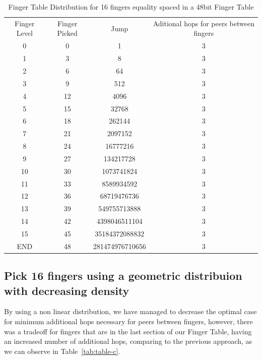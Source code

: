 \begin{table}
    \centering
    \begin{tabular}{| c | c | c | c |}
    \hline
        Finger Level &  Finger Picked & Jump & Aditional hops for peers between fingers \\
        0 & 0 & 1 & 3 \\
        1 & 3 & 8 & 3 \\
        2 & 6 & 64 & 3 \\
        3 & 9 & 512 & 3 \\
        4 & 12 & 4096 & 3 \\
        5 & 15 & 32768 & 3 \\
        6 & 18 & 262144 & 3 \\
        7 & 21 & 2097152 & 3 \\
        8 & 24 & 16777216 & 3 \\
        9 & 27 & 134217728 & 3 \\
        10 & 30 & 1073741824 & 3 \\
        11 & 33 & 8589934592 & 3 \\
        12 & 36 & 68719476736 & 3 \\
        13 & 39 & 549755713888 & 3 \\
        14 & 42 & 4398046511104 & 3 \\
        15 & 45 & 35184372088832 & 3 \\
        END & 48 & 281474976710656 & 3 \\
    \hline
    \end{tabular}
    \caption{Finger Table Distribution for 16 fingers equality spaced in a 48bit Finger Table}
    \label{tbl:table-b}
\end{table}

\subsection{Pick 16 fingers using a geometric distribuion with decreasing density}

By using a non linear distribution, we have managed to decrease the optimal case for minimum additional hops necessary for peers between fingers, however, there was a tradeoff for fingers that are in the last section of our Finger Table, having an increased number of additional hops, comparing to the previous approach, as we can observe in Table~\ref{tab:table-c}.

